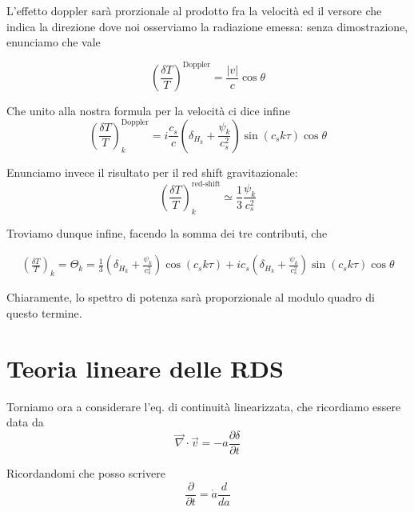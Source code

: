 \documentclass{report}
\begin{document}
L'effetto doppler sarà prorzionale al prodotto fra la velocità ed il versore che indica la direzione dove noi osserviamo la radiazione emessa: senza dimostrazione, enunciamo che vale 

\begin{equation}
    \left(\frac{\delta T}{T}\right)^{\text{Doppler}} = \frac{|v|}{c}\cos \theta
\end{equation}

Che unito alla nostra formula per la velocità ci dice infine 
\begin{equation}
    \left(\frac{\delta T}{T} \right)^{\text{Doppler}}_k = i\frac{c_s}{c}\left(\delta_{H_k} + \frac{\psi_k}{c_s^2}\right)\sin(c_sk\tau)\cos\theta
\end{equation}

Enunciamo invece il risultato per il red shift gravitazionale: 
\begin{equation}
    \left(\frac{\delta T}{T} \right)_k^{\text{red-shift}} \simeq \frac{1}{3}\frac{\psi_k}{c_s^2}
\end{equation}

Troviamo dunque infine, facendo la somma dei tre contributi, che 
\begin{tcolorbox}[colback=gray!15, colframe=black, boxrule=1pt]
\begin{align}
    \left(\frac{\delta T}{T} \right)_k = \Theta_k = \frac{1}{3}\left(\delta_{H_k}  + \frac{\psi_k}{c_s^2}\right)\cos{(c_sk\tau)} + ic_s\left(\delta_{H_k} + \frac{\psi_k}{c_s^2}\right)\sin(c_sk\tau)\cos\theta
\end{align}
\end{tcolorbox}

Chiaramente, lo spettro di potenza sarà proporzionale al modulo quadro di questo termine. 

\section{Teoria lineare delle RDS}

Torniamo ora a considerare l'eq. di continuità linearizzata, che ricordiamo essere data da 
\begin{equation}
    \vec{\nabla}\cdot \vec{v} = -a\frac{\partial \delta}{\partial t}
\end{equation}

Ricordandomi che posso scrivere 
\begin{equation}
    \frac{\partial}{\partial t} = \dot{a}\frac{d}{da}
\end{equation}
\end{document}

